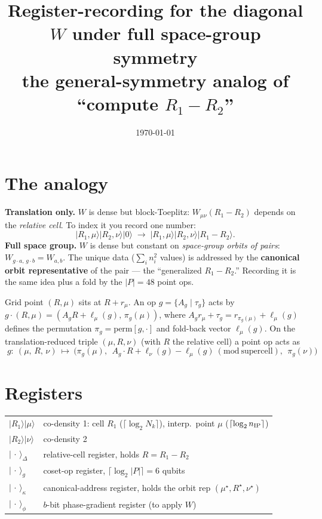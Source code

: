 \documentclass[11pt]{article}
\title{\vspace{-1.2cm}Register-recording for the diagonal $W$ under full space-group symmetry\\[2pt]
\normalsize the general-symmetry analog of ``compute $R_1-R_2$''}
\author{}\date{\today}
\newcommand{\ket}[1]{\lvert #1\rangle}
\begin{document}
\maketitle\vspace{-0.8cm}

\section*{The analogy}
\textbf{Translation only.} $W$ is dense but block-Toeplitz: $W_{\mu\nu}(R_1-R_2)$ depends on the
\emph{relative cell}. To index it you record one number:
\[
   \ket{R_1,\mu}\ket{R_2,\nu}\ket{0} \;\longrightarrow\; \ket{R_1,\mu}\ket{R_2,\nu}\ket{R_1-R_2}.
\]
\textbf{Full space group.} $W$ is dense but constant on \emph{space-group orbits of pairs}:
$W_{g\cdot a,\,g\cdot b}=W_{a,b}$. The unique data ($\sum_i n_i^2$ values) is addressed by the
\textbf{canonical orbit representative} of the pair --- the ``generalized $R_1-R_2$.'' Recording it
is the same idea plus a fold by the $|P|=48$ point ops.

Grid point $(R,\mu)$ sits at $R+r_\mu$. An op $g=\{A_g\mid\tau_g\}$ acts by
$g\!\cdot\!(R,\mu)=(A_g R+\ell_\mu(g),\,\pi_g(\mu))$, where $A_g r_\mu+\tau_g=r_{\pi_g(\mu)}+\ell_\mu(g)$
defines the permutation $\pi_g=\mathrm{perm}[g,\cdot]$ and fold-back vector $\ell_\mu(g)$. On the
translation-reduced triple $(\mu,R,\nu)$ (with $R$ the relative cell) a point op acts as
\[
   \boxed{\;g:\ (\mu,\,R,\,\nu)\ \longmapsto\ \big(\pi_g(\mu),\ \ A_g\!\cdot\!R+\ell_\nu(g)-\ell_\mu(g)\ (\mathrm{mod}\ \text{supercell}),\ \ \pi_g(\nu)\big)\;}
\]

\section*{Registers}
\begin{tabular}{ll}
$\ket{R_1}\ket{\mu}$ & co-density 1: cell $R_1$ ($\lceil\log_2 N_k\rceil$), interp.\ point $\mu$ ($\lceil\log_2 n_{\rm IP}\rceil$)\\
$\ket{R_2}\ket{\nu}$ & co-density 2\\
$\ket{\,\cdot\,}_\Delta$ & relative-cell register, holds $R=R_1-R_2$\\
$\ket{\,\cdot\,}_g$ & coset-op register, $\lceil\log_2|P|\rceil=6$ qubits\\
$\ket{\,\cdot\,}_\kappa$ & canonical-address register, holds the orbit rep $(\mu^\star,R^\star,\nu^\star)$\\
$\ket{\,\cdot\,}_\phi$ & $b$-bit phase-gradient register (to apply $W$)\\
\end{tabular}
\end{document}
